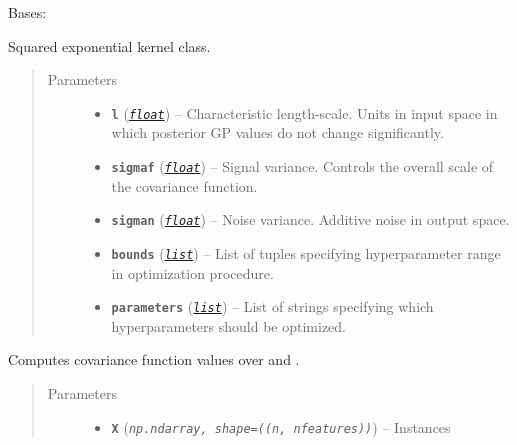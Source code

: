 \documentclass[letterpaper,10pt,english]{sphinxmanual}
\begin{document}
\begin{fulllineitems}
\label{pyGPGO.covfunc:pyGPGO.covfunc.squaredExponential}
Bases: \href{https://docs.python.org/2/library/functions.html\#object}{}

Squared exponential kernel class.
\begin{quote}\begin{description}
\item[{Parameters}] \leavevmode\begin{itemize}
\item {} 
\textbf{\texttt{l}} (\href{https://docs.python.org/2/library/functions.html\#float}{\emph{\texttt{float}}}) -- Characteristic length-scale. Units in input space in which posterior GP values do not
change significantly.

\item {} 
\textbf{\texttt{sigmaf}} (\href{https://docs.python.org/2/library/functions.html\#float}{\emph{\texttt{float}}}) -- Signal variance. Controls the overall scale of the covariance function.

\item {} 
\textbf{\texttt{sigman}} (\href{https://docs.python.org/2/library/functions.html\#float}{\emph{\texttt{float}}}) -- Noise variance. Additive noise in output space.

\item {} 
\textbf{\texttt{bounds}} (\href{https://docs.python.org/2/library/functions.html\#list}{\emph{\texttt{list}}}) -- List of tuples specifying hyperparameter range in optimization procedure.

\item {} 
\textbf{\texttt{parameters}} (\href{https://docs.python.org/2/library/functions.html\#list}{\emph{\texttt{list}}}) -- List of strings specifying which hyperparameters should be optimized.

\end{itemize}

\end{description}\end{quote}

\begin{fulllineitems}
\label{pyGPGO.covfunc:pyGPGO.covfunc.squaredExponential.K}
Computes covariance function values over  and .
\begin{quote}\begin{description}
\item[{Parameters}] \leavevmode\begin{itemize}
\item {} 
\textbf{\texttt{X}} (\emph{\texttt{np.ndarray, shape=((n, nfeatures))}}) -- Instances


\end{itemize}
\end{description}
\end{quote}
\end{fulllineitems}
\end{fulllineitems}
\end{document}
